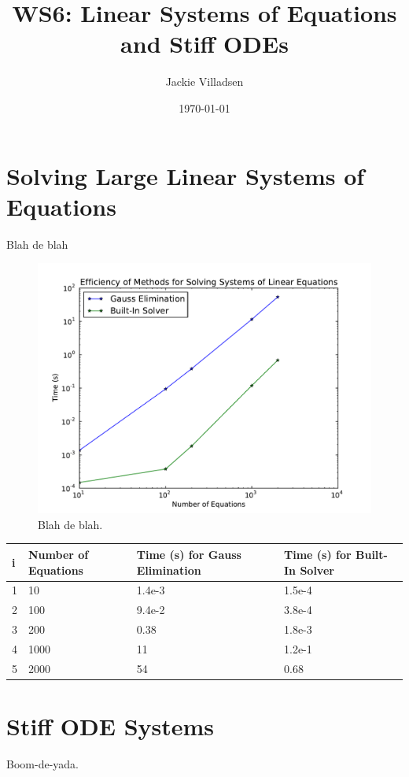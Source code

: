 \documentclass{article}
\begin{document}
\title{WS6: Linear Systems of Equations and Stiff ODEs}
\author{Jackie Villadsen}
\date{\today}
\maketitle


\section{Solving Large Linear Systems of Equations}
Blah de blah

\begin{figure}[h]
  \begin{center}
     \includegraphics[width=\textwidth]{linsystimes}
  \end{center}
  \caption{Blah de blah.}
  \label{fig:times}
\end{figure}

\begin{table}[p]
\centering
\begin{tabular}{|l|l|l|l|}
\hline
i & Number of Equations & Time (s) for Gauss Elimination & Time (s) for Built-In Solver \\
\hline
1 & 10 & 1.4e-3 & 1.5e-4 \\
2 & 100 & 9.4e-2 & 3.8e-4 \\
3 & 200 & 0.38 & 1.8e-3 \\
4 & 1000 & 11 & 1.2e-1 \\
5 & 2000 & 54 & 0.68 \\
\hline
\end{tabular}
\end{table}

\section{Stiff ODE Systems}
Boom-de-yada.
\end{document}
